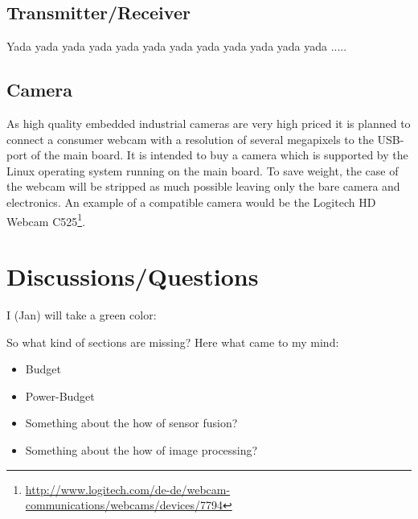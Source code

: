 \documentclass[fontsize=11pt,paper=a4,]{scrartcl}
\begin{document}
\subsection*{Transmitter/Receiver}

Yada yada yada yada yada yada yada yada yada yada yada yada .....

\subsection*{Camera}

As high quality embedded industrial cameras are very high priced it is planned to connect a consumer webcam with a resolution of several megapixels to the USB-port of the main board. It is intended to buy a camera which is supported by the Linux operating system running on the main board. To save weight, the case of the webcam will be stripped as much possible leaving only the bare camera and electronics. An example of a compatible camera would be the Logitech HD Webcam C525\footnote{\url{http://www.logitech.com/de-de/webcam-communications/webcams/devices/7794}}.


\section{Discussions/Questions}

I (Jan) will take {\color{green} a green color}:

{\color{green} So what kind of sections are missing? Here what came to my mind:
\begin{itemize}
 \item Budget
 \item Power-Budget
 \item Something about the how of sensor fusion?
 \item Something about the how of image processing?
\end{itemize}
}

\printbibliography
\end{document}
